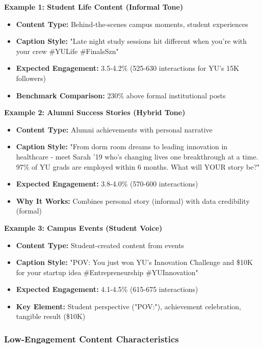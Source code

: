 \documentclass[12pt]{report}
\begin{document}
\textbf{Example 1: Student Life Content (Informal Tone)}
\begin{itemize}
    \item \textbf{Content Type:} Behind-the-scenes campus moments, student experiences
    \item \textbf{Caption Style:} "Late night study sessions hit different when you're with your crew \#YULife \#FinalsSzn"
    \item \textbf{Expected Engagement:} 3.5-4.2\% (525-630 interactions for YU's 15K followers)
    \item \textbf{Benchmark Comparison:} 230\% above formal institutional posts
\end{itemize}

\textbf{Example 2: Alumni Success Stories (Hybrid Tone)}
\begin{itemize}
    \item \textbf{Content Type:} Alumni achievements with personal narrative
    \item \textbf{Caption Style:} "From dorm room dreams to leading innovation in healthcare - meet Sarah '19 who's changing lives one breakthrough at a time. 97\% of YU grads are employed within 6 months. What will YOUR story be?"
    \item \textbf{Expected Engagement:} 3.8-4.0\% (570-600 interactions)
    \item \textbf{Why It Works:} Combines personal story (informal) with data credibility (formal)
\end{itemize}

\textbf{Example 3: Campus Events (Student Voice)}
\begin{itemize}
    \item \textbf{Content Type:} Student-created content from events
    \item \textbf{Caption Style:} "POV: You just won YU's Innovation Challenge and \$10K for your startup idea \#Entrepreneurship \#YUInnovation"
    \item \textbf{Expected Engagement:} 4.1-4.5\% (615-675 interactions)
    \item \textbf{Key Element:} Student perspective ("POV:"), achievement celebration, tangible result (\$10K)
\end{itemize}

\subsubsection{Low-Engagement Content Characteristics}
\end{document}
